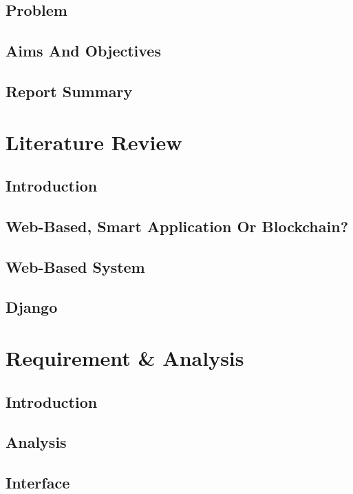 \documentclass[a4paper,12pt,oneside]{book}
\begin{document}
	\section{Problem}
		
	\section{Aims And Objectives}
		
	\section{Report Summary}
		

\chapter{Literature Review}
	\section{Introduction}
		
	\section{Web-Based, Smart Application Or Blockchain?}
		
	\section{Web-Based System}
		
	\section{Django}
			
		
\chapter{Requirement \& Analysis}
	\section{Introduction}
		
	\section{Analysis}
		
	\section{Interface}
		
\end{document}
